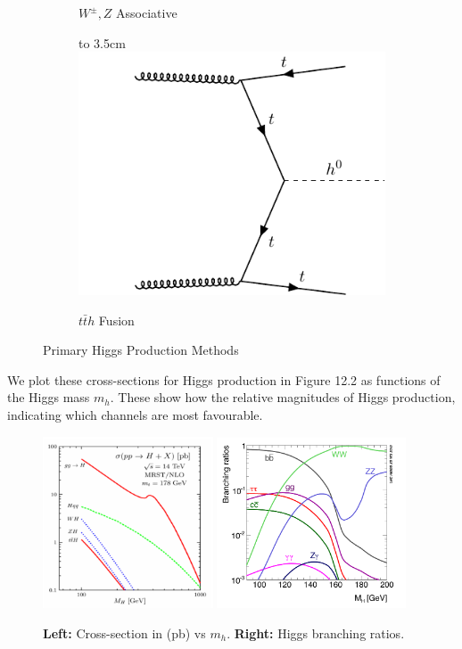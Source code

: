 \documentclass[a4paper, 11pt, normalem]{report}
\def\imagebox#1#2{\vtop to #1{\null\hbox{#2}\vfill}}
\begin{document}
\begin{figure}[H]
\begin{subfigure}[b]{0.24\textwidth}
        \caption{$W^\pm,Z$ Associative}
    \end{subfigure}
    \begin{subfigure}[b]{0.24\textwidth}
        \imagebox{3.5cm}{\includegraphics[width=\textwidth]{higgs3.pdf}}
        \caption{$t\bar{t}h$ Fusion}
    \end{subfigure}
    \caption{Primary Higgs Production Methods}
    \vspace{-10pt}
\end{figure}
We plot these cross-sections for Higgs production in Figure 12.2 as functions of the Higgs mass $m_h$.
These show how the relative magnitudes of Higgs production, indicating which channels are most favourable.
\begin{figure}[H]
    \centering
    \includegraphics[width=0.45\textwidth]{higgscross.png}
    \includegraphics[width=0.5\textwidth]{higgsbranch.png}
    \caption{\textbf{Left:} Cross-section in (pb) vs $m_h$. \textbf{Right:} Higgs branching ratios.}
\end{figure}
\end{document}
